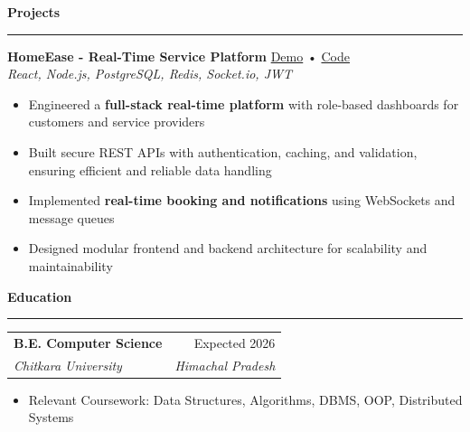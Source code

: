 \documentclass[10pt, letterpaper]{article}
\makeatletter
\newcommand{\resumesection}[1]{
\vspace{6pt}
{\large \textbf{\textcolor{accent}{#1}}}
\vspace{2pt}
\hrule
\vspace{4pt}
}
\newcommand{\experience}[4]{
\begin{tabularx}
	{\textwidth}{@{} X r @{}} \textbf{#1} & #2 \\ \textit{#3} & \textit{#4} \\
\end{tabularx}
}
\newcommand{\project}[4]{
\vspace{2pt}
\textbf{#1} \hfill \href{#3}{\faIcon{globe} Demo} •
\href{#4}{\faIcon{github} Code} \\ \textit{\small #2}
\vspace{2pt}
}
\makeatother
\begin{document}
	\resumesection{Projects}

	\project{HomeEase - Real-Time Service Platform} {React, Node.js, PostgreSQL, Redis, Socket.io, JWT}
	{https://homeease-oa77.onrender.com/} {https://github.com/SharadJ19/homeease}

	\begin{itemize}
		\item Engineered a \textbf{full-stack real-time platform} with role-based
			dashboards for customers and service providers

		\item Built secure REST APIs with authentication, caching, and validation,
			ensuring efficient and reliable data handling

		\item Implemented \textbf{real-time booking and notifications} using
			WebSockets and message queues

		\item Designed modular frontend and backend architecture for scalability and
			maintainability
	\end{itemize}

	\resumesection{Education}

	\experience{B.E. Computer Science}{Expected 2026} {Chitkara University}{Himachal Pradesh}

	\vspace{-6pt}
	\begin{itemize}
		\item Relevant Coursework: Data Structures, Algorithms, DBMS, OOP,
			Distributed Systems
	\end{itemize}
\end{document}
